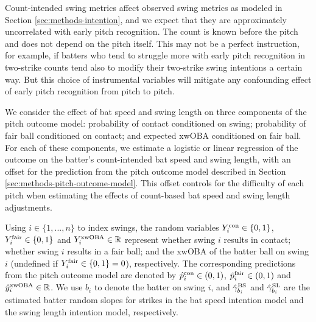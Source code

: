 \documentclass{article}
\begin{document}
      Count-intended swing metrics affect observed swing metrics as modeled in Section \ref{sec:methods-intention}, and we expect that they are approximately uncorrelated with early pitch recognition. The count is known before the pitch and does not depend on the pitch itself. This may not be a perfect instruction, for example, if batters who tend to struggle more with early pitch recognition in two-strike counts tend also to modify their two-strike swing intentions a certain way. But this choice of instrumental variables will mitigate any confounding effect of early pitch recognition from pitch to pitch.

      We consider the effect of bat speed and swing length on three components of the pitch outcome model: probability of contact conditioned on swing; probability of fair ball conditioned on contact; and expected xwOBA conditioned on fair ball. For each of these components, we estimate a logistic or linear regression of the outcome on the batter's count-intended bat speed and swing length, with an offset for the prediction from the pitch outcome model described in Section \ref{sec:methods-pitch-outcome-model}. This offset controls for the difficulty of each pitch when estimating the effects of count-based bat speed and swing length adjustments.

      Using $i \in \{1, ..., n\}$ to index swings, the random variables $Y_i^{\mbox{\scriptsize con}} \in \{0, 1\}$, $Y_i^{\mbox{\scriptsize fair}} \in \{0, 1\}$ and $Y_i^{\mbox{\scriptsize xwOBA}} \in \mathbb{R}$ represent whether swing $i$ results in contact; whether swing $i$ results in a fair ball; and the xwOBA of the batter ball on swing $i$ (undefined if $Y_i^{\mbox{\scriptsize fair}} \in \{0, 1\} = 0$), respectively. The corresponding predictions from the pitch outcome model are denoted by $\hat p_i^{\mbox{\scriptsize con}} \in (0, 1)$,  $\hat p_i^{\mbox{\scriptsize fair}} \in (0, 1)$ and $\hat y_i^{\mbox{\scriptsize xwOBA}} \in \mathbb{R}$. We use $b_i$ to denote the batter on swing $i$, and $\hat\gamma_{b_i}^{\mbox{\scriptsize BS}}$ and $\hat\gamma_{b_i}^{\mbox{\scriptsize SL}}$ are the estimated batter random slopes for strikes in the bat speed intention model and the swing length intention model, respectively.
\end{document}
